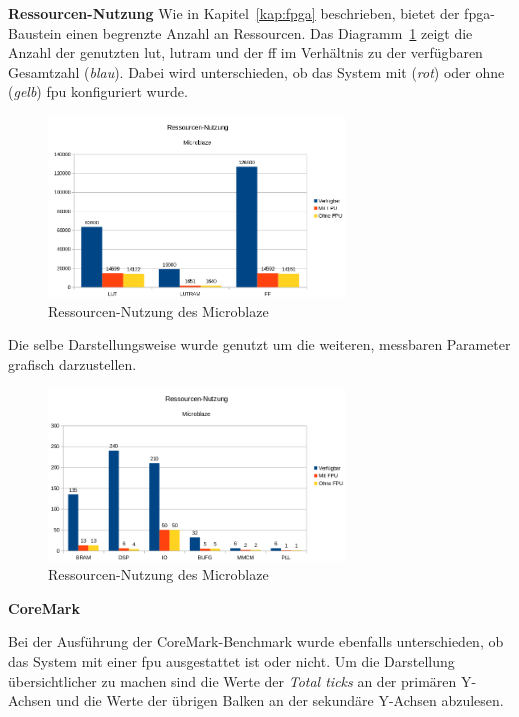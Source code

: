 \textbf{Ressourcen-Nutzung}
Wie in Kapitel~\ref{kap:fpga} beschrieben, bietet der \ac{fpga}-Baustein einen begrenzte Anzahl an Ressourcen.
Das Diagramm~\ref{fig:ressourcenmb1} zeigt die Anzahl der genutzten \ac{lut}, \ac{lutram} und der \ac{ff} im Verhältnis zu der verfügbaren Gesamtzahl (\emph{blau}). Dabei wird unterschieden,
ob das System mit (\emph{rot}) oder ohne (\emph{gelb}) \ac{fpu} konfiguriert wurde.\\

\begin{figure}[H]
\centering
\includegraphics[width=0.7\textwidth]{Hauptteil/ressourcenmb1.png}
\caption{Ressourcen-Nutzung des Microblaze}
\label{fig:ressourcenmb1}
\end{figure}

Die selbe Darstellungsweise wurde genutzt um die weiteren, messbaren Parameter grafisch darzustellen.\\

\begin{figure}[H]
\centering
\includegraphics[width=0.7\textwidth]{Hauptteil/ressourcenmb2.png}
\caption{Ressourcen-Nutzung des Microblaze}
\label{fig:ressourcenmb2}
\end{figure}

\textbf{CoreMark}

Bei der Ausführung der CoreMark-Benchmark wurde ebenfalls unterschieden, ob das System mit einer \ac{fpu} ausgestattet ist oder nicht.
Um die Darstellung übersichtlicher zu machen sind die Werte der \emph{Total ticks} an der primären Y-Achsen und die Werte der übrigen Balken an der sekundäre Y-Achsen abzulesen.\\

